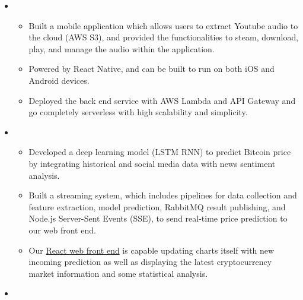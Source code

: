 \documentclass[12pt,a4paper,sans]{moderncv}        %
\begin{document}
\begin{itemize}

\item{

\begin{itemize}
\item{Built a mobile application which allows users to extract Youtube audio to the cloud (AWS S3), and provided the functionalities to steam, download, play, and manage the audio within the application.}
\vspace{3pt}
\item{Powered by React Native, and can be built to run on both iOS and Android devices.}
\vspace{3pt}
\item{Deployed the back end service with AWS Lambda and API Gateway and go completely serverless with high scalability and simplicity.}
\end{itemize}}

\vspace{14pt}

\item{

\begin{itemize}
\item{Developed a deep learning model (LSTM RNN) to predict Bitcoin price by integrating historical and social media data with news sentiment analysis.}
\vspace{3pt}
\item{Built a streaming system, which includes pipelines for data collection and feature extraction, model prediction, RabbitMQ result publishing, and Node.js Server-Sent Events (SSE), to send real-time price prediction to our web front end.}
\vspace{3pt}
\item{Our \textcolor{cyan}{\href{http://crypto-host.s3-website-us-west-2.amazonaws.com}{React web front end}} is capable updating charts itself with new incoming prediction as well as displaying the latest cryptocurrency market information and some statistical analysis.}
\end{itemize}}

\vspace{14pt}

\item{

}
\end{itemize}
\end{document}

